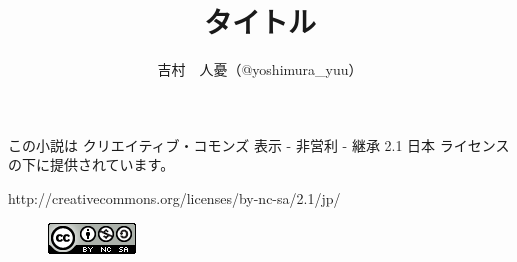 \documentclass[10pt,b6paper]{jsbook}
\title{タイトル}
\author{吉村　人憂（@yoshimura\_yuu）}
\begin{document}
\maketitle

\begin{shadebox}
この小説は クリエイティブ・コモンズ 表示 - 非営利 - 継承 2.1 日本 ライセンスの下に提供されています。

http://creativecommons.org/licenses/by-nc-sa/2.1/jp/
\end{shadebox}

\begin{figure}[htpb]
	\begin{center}
		\includegraphics{img/by-nc-sa.png}
	\end{center}
\end{figure}

\clearpage

\tableofcontents
\clearpage


\end{document}
